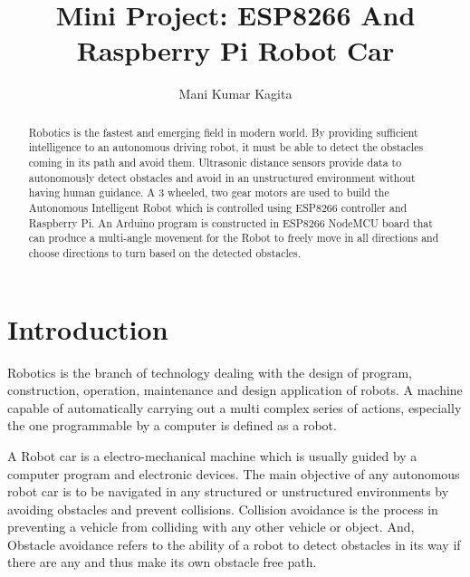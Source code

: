 \documentclass[sigconf]{acmart}
\begin{document}
\title{Mini Project: ESP8266 And Raspberry Pi Robot Car}

\author{Mani Kumar Kagita}


\begin{abstract}
Robotics is the fastest and emerging field in modern world. By providing sufficient intelligence to an autonomous driving robot, it must be able to detect the obstacles coming in its path and avoid them. Ultrasonic distance sensors provide data to autonomously detect obstacles and avoid in an unstructured environment without having human guidance. A 3 wheeled, two gear motors are used to build the Autonomous Intelligent Robot which is controlled using ESP8266 controller and Raspberry Pi. An Arduino program is constructed in ESP8266 NodeMCU board that can produce a multi-angle movement for the Robot to freely move in all directions and choose directions to turn based on the detected obstacles. 

\end{abstract}


\maketitle

\section{Introduction}
Robotics is the branch of technology dealing with the design of program, construction, operation, maintenance and design application of robots. A machine capable of automatically carrying out a multi complex series of actions, especially the one programmable by a computer is defined as a robot. 

A Robot car is a electro-mechanical machine which is usually guided by a computer program and electronic devices. The main objective of any autonomous robot car is to be navigated in any structured or unstructured environments by avoiding obstacles and prevent collisions. 
Collision avoidance is the process in preventing a vehicle from colliding with any other vehicle or object. And, Obstacle avoidance refers to the ability of a robot to detect obstacles in its way if there are any and thus make its own obstacle free path.
\end{document}
